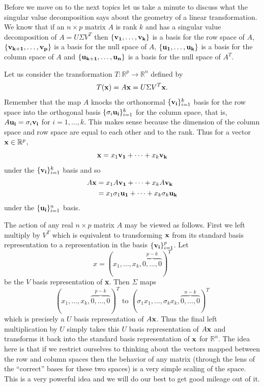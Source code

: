 \documentclass{book}
\begin{document}
Before we move on to the next topics let us take a minute to discuss what the singular value decomposition says about the geometry of a linear transformation. We know that if an $n \times p$ matrix $A$ is rank $k$ and has a singular value decomposition of $A=U\Sigma V^T$ then $\{ {\bf v_1},\ldots,{\bf v_k}\}$ is a basis for the row space of $A$, $\{{\bf v_{k+1}},\ldots,{\bf v_p}\}$ is a basis for the null space of $A$, $\{ {\bf u_1},\ldots,{\bf u_k}\}$ is a basis for the column space of $A$ and $\{ {\bf u_{k+1}},\ldots,{\bf u_n}\}$ is a basis for the null space of $A^T$. 

Let us consider the transformation $T:\mathbb{R}^p\rightarrow \mathbb{R}^n$ defined by
$$
T({\bf x})=A{\bf x}=U\Sigma V^T{\bf x}.
$$
Remember that the map $A$ knocks the orthonormal $\{{\bf v_i}\}_{i=1}^{k}$ basis for the row space into the orthogonal basis $\{\sigma_i{\bf u_i}\}_{i=1}^{k}$ for the column space, that is, $A{\bf u_i}=\sigma_i{\bf v_i}$ for $i=1,\ldots,k$. This makes sense because the dimension of the column space and row space are equal to each other and to the rank. Thus for a vector ${\bf x}\in\mathbb{R}^p$, 
$$
{\bf x}=x_1{\bf v_1}+\cdots+x_k{\bf v_k}
$$
under the $\{{\bf v_i}\}_{i=1}^{k}$ basis and so 
$$
\begin{aligned}
A{\bf x}&=x_1A{\bf v_1}+\cdots+x_kA{\bf v_k}\\
&=x_1\sigma_1{\bf u_1}+\cdots+x_k\sigma_k{\bf u_k}
\end{aligned}
$$
under the $\{{\bf u_i}\}_{i=1}^{n}$ basis. 

The action of any real $n \times p$ matrix $A$ may be viewed as follows. First we left multiply by $V^T$ which is equivalent to transforming ${\bf x}$ from its standard basis representation to a representation in the basis $\{{\bf v_i}\}_{i=1}^{p}$. Let 
$$
x=(x_1,\ldots,x_k,\overset{p-k}{\overbrace{0,\ldots,0}})^T
$$
be the $V$ basis representation of {\bf x}. Then $\Sigma$ maps 
$$
(x_1,\ldots,x_k,\overset{p-k}{\overbrace{0,\ldots,0}})^T\text{ to }(\sigma_1x_1,\ldots,\sigma_kx_k,\overset{n-k}{\overbrace{0,\ldots,0}})^T
$$
which is precisely a $U$ basis representation of $A{\bf x}$. Thus the final left multiplication by $U$ simply takes this $U$ basis representation of $A{\bf x}$ and transforms it back into the standard basis representation of ${\bf x}$ for $\mathbb{R}^n$. The idea here is that if we restrict ourselves to thinking about the vectors mapped between the row and column spaces then the behavior of any matrix (through the lens of the ``correct'' bases for these two spaces) is a very simple scaling of the space. This is a very powerful idea and we will do our best to get good mileage out of it. 
\end{document}
